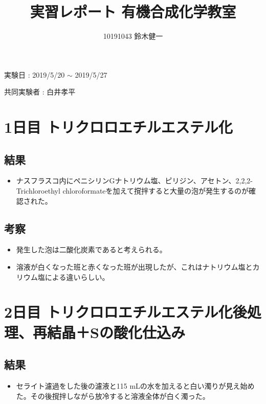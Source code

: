 \documentclass[a4paper,papersize,dvipdfmx]{jsarticle}
\begin{document}
\title{実習レポート 有機合成化学教室}
\author{10191043 鈴木健一}
\date{}
\maketitle


\begin{flushright}
実験日 : 2019/5/20 $\sim$ 2019/5/27

共同実験者 : 白井孝平
\end{flushright}

\section*{1日目 トリクロロエチルエステル化}
\subsection*{結果}
\begin{itemize}
\item ナスフラスコ内にペニシリンGナトリウム塩、ピリジン、アセトン、2,2,2-Trichloroethyl chloroformateを加えて撹拌すると大量の泡が発生するのが確認された。


\end{itemize}
\subsection*{考察}
\begin{itemize}
\item 発生した泡は二酸化炭素であると考えられる。
\item 溶液が白くなった班と赤くなった班が出現したが、これはナトリウム塩とカリウム塩による違いらしい。


\end{itemize}
\section*{2日目 トリクロロエチルエステル化後処理、再結晶＋Sの酸化仕込み}
\subsection*{結果}
\begin{itemize}
\item セライト濾過をした後の濾液と115 mLの水を加えると白い濁りが見え始めた。その後撹拌しながら放冷すると溶液全体が白く濁った。

\end{itemize}
\end{document}
